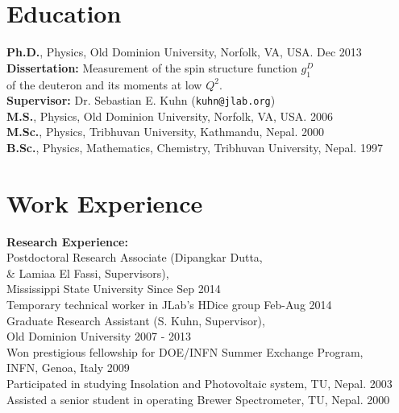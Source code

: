 \documentclass[10pt, letterpaper]{article}
\newcommand{\years}[1]{\marginnote{\small #1}} %
\begin{document}
\section*{Education}
\noindent
    \textbf{Ph.D.}, Physics, Old Dominion University, Norfolk, VA, USA.  \hfill Dec 2013\\
       \hspace*{5 mm} \textbf{Dissertation:} Measurement of the spin structure function $g^D_{1}$ \\
       \hspace*{10 mm} of the deuteron and its moments at low $Q^2$. \\
       \hspace*{5 mm} \textbf{Supervisor:} Dr. Sebastian E. Kuhn (\texttt{kuhn@jlab.org}) \\
    \textbf{M.S.}, Physics, Old Dominion University, Norfolk, VA, USA. \hfill 2006 \\ 
    \textbf{M.Sc.}, Physics, Tribhuvan University, Kathmandu, Nepal. \hfill 2000 \\ 
    \textbf{B.Sc.}, Physics, Mathematics, Chemistry, Tribhuvan University, Nepal. \hfill 1997 %


\section*{Work Experience}
\noindent
		{\bf Research Experience:} \\
		Postdoctoral Research Associate (Dipangkar Dutta, \\
                 \hspace*{3 mm} \& Lamiaa El Fassi, Supervisors), \\
		 \hspace*{3 mm} Mississippi State University \hfill Since Sep 2014 \\
	    Temporary technical worker in JLab's HDice group \hfill Feb-Aug 2014\\
		Graduate Research Assistant (S. Kuhn, Supervisor), \\
		\hspace*{3 mm} Old Dominion University \hfill 2007 - 2013 \\
		Won prestigious fellowship for DOE/INFN Summer Exchange Program, \\
		\hspace*{3 mm} INFN, Genoa, Italy \hfill 2009 \\
		Participated in studying Insolation and Photovoltaic system, TU, Nepal. \hfill 2003 \\
		Assisted a senior student in operating Brewer Spectrometer, TU, Nepal. \hfill 2000 \\
\end{document}
